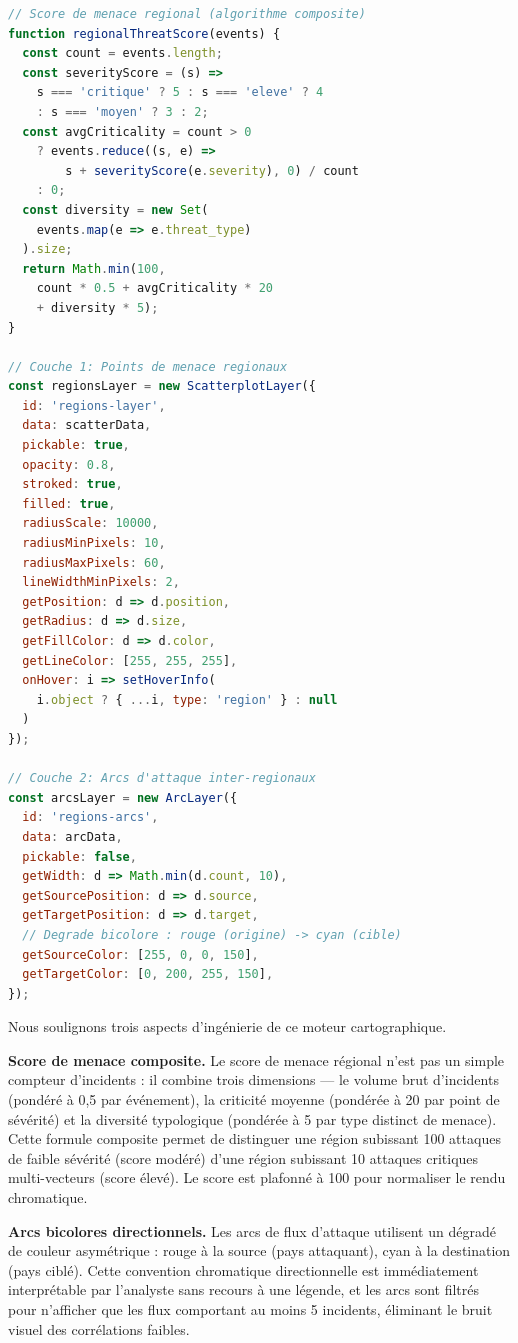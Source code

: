 \begin{lstlisting}[language=JavaScript, caption={Configuration des couches Deck.gl : ScatterplotLayer (régions) et ArcLayer (flux d'attaque inter-régionaux) pour le niveau stratégique.}, label={lst:deckgl-layers}]
// Score de menace regional (algorithme composite)
function regionalThreatScore(events) {
  const count = events.length;
  const severityScore = (s) =>
    s === 'critique' ? 5 : s === 'eleve' ? 4
    : s === 'moyen' ? 3 : 2;
  const avgCriticality = count > 0
    ? events.reduce((s, e) =>
        s + severityScore(e.severity), 0) / count
    : 0;
  const diversity = new Set(
    events.map(e => e.threat_type)
  ).size;
  return Math.min(100,
    count * 0.5 + avgCriticality * 20
    + diversity * 5);
}

// Couche 1: Points de menace regionaux
const regionsLayer = new ScatterplotLayer({
  id: 'regions-layer',
  data: scatterData,
  pickable: true,
  opacity: 0.8,
  stroked: true,
  filled: true,
  radiusScale: 10000,
  radiusMinPixels: 10,
  radiusMaxPixels: 60,
  lineWidthMinPixels: 2,
  getPosition: d => d.position,
  getRadius: d => d.size,
  getFillColor: d => d.color,
  getLineColor: [255, 255, 255],
  onHover: i => setHoverInfo(
    i.object ? { ...i, type: 'region' } : null
  )
});

// Couche 2: Arcs d'attaque inter-regionaux
const arcsLayer = new ArcLayer({
  id: 'regions-arcs',
  data: arcData,
  pickable: false,
  getWidth: d => Math.min(d.count, 10),
  getSourcePosition: d => d.source,
  getTargetPosition: d => d.target,
  // Degrade bicolore : rouge (origine) -> cyan (cible)
  getSourceColor: [255, 0, 0, 150],
  getTargetColor: [0, 200, 255, 150],
});
\end{lstlisting}

Nous soulignons trois aspects d'ingénierie de ce moteur cartographique.

\textbf{Score de menace composite.} Le score de menace régional n'est pas un simple compteur d'incidents : il combine trois dimensions --- le volume brut d'incidents (pondéré à 0,5 par événement), la criticité moyenne (pondérée à 20 par point de sévérité) et la diversité typologique (pondérée à 5 par type distinct de menace). Cette formule composite permet de distinguer une région subissant 100 attaques de faible sévérité (score modéré) d'une région subissant 10 attaques critiques multi-vecteurs (score élevé). Le score est plafonné à 100 pour normaliser le rendu chromatique.

\textbf{Arcs bicolores directionnels.} Les arcs de flux d'attaque utilisent un dégradé de couleur asymétrique : rouge à la source (pays attaquant), cyan à la destination (pays ciblé). Cette convention chromatique directionnelle est immédiatement interprétable par l'analyste sans recours à une légende, et les arcs sont filtrés pour n'afficher que les flux comportant au moins 5 incidents, éliminant le bruit visuel des corrélations faibles.

